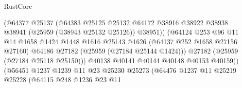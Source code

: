 \begin{lexlean}{RustCore}
\begin{coremodule}
                                          (@64377
                                            @25137
                                            (@64383
                                              @25125
                                              @25132
                                              @64172
                                              @38916
                                              @38922
                                              @38938
                                              @38941
                                              (@25959 (@38943 @25132 @25126))
                                              @38951))
                                          (@64124
                                            @253
                                            @96
                                            @11
                                            @14
                                            @1658
                                            @1424
                                            @1448
                                            @1616
                                            @25143
                                            @1626
                                            (@64137 @252 @1658 @27156 @27160)
                                            @64186
                                            @27182
                                            (@25959 (@27184 @25144 @1424)))
                                          @27182
                                          (@25959 (@27184 @25118 @25150)))
                                        @40138
                                        @40141
                                        @40144
                                        @40148
                                        @40153
                                        @40159))
                                    (@56451
                                      @1237
                                      @1239
                                      @11
                                      @23
                                      @25230
                                      @25273
                                      (@64476
                                        @1237
                                        @11
                                        @25219
                                        @25228
                                        (@64115
                                          @248
                                          @1236
                                          @23
                                          @11

\end{coremodule}
\end{lexlean}
